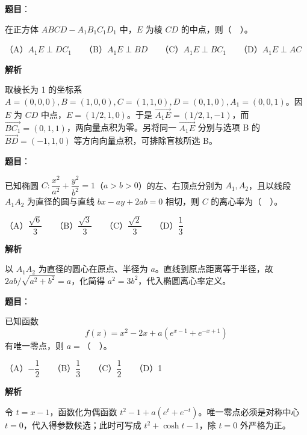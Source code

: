 \begin{answer}

\textbf{题目}：

在正方体 \(ABCD-A_1B_1C_1D_1\) 中，\(E\) 为棱 \(CD\) 的中点，则（　）。

（A）\(A_1E\perp DC_1\)　　（B）\(A_1E\perp BD\)　　（C）\(A_1E\perp BC_1\)　　（D）\(A_1E\perp AC\)

\textbf{解析}

取棱长为 1 的坐标系 \(A=(0,0,0),B=(1,0,0),C=(1,1,0),D=(0,1,0),A_1=(0,0,1)\)。因 \(E\) 为 \(CD\) 中点，\(E=(1/2,1,0)\)。于是 \(\overrightarrow{A_1E}=(1/2,1,-1)\)，而 \(\overrightarrow{BC_1}=(0,1,1)\)，两向量点积为零。另将同一 \(\overrightarrow{A_1E}\) 分别与选项 B 的 \(\overrightarrow{BD}=(-1,1,0)\) 等方向向量点积，可排除盲核所选 B。


\end{answer}
\begin{answer}

\textbf{题目}：

已知椭圆 \(C:\dfrac{x^2}{a^2}+\dfrac{y^2}{b^2}=1\)（\(a>b>0\)）的左、右顶点分别为 \(A_1,A_2\)，且以线段 \(A_1A_2\) 为直径的圆与直线 \(bx-ay+2ab=0\) 相切，则 \(C\) 的离心率为（　）。

（A）\(\dfrac{\sqrt{6}}{3}\)　　（B）\(\dfrac{\sqrt{3}}{3}\)　　（C）\(\dfrac{\sqrt{2}}{3}\)　　（D）\(\dfrac{1}{3}\)

\textbf{解析}

以 \(A_1A_2\) 为直径的圆心在原点、半径为 \(a\)。直线到原点距离等于半径，故 \(2ab/\sqrt{a^2+b^2}=a\)，化简得 \(a^2=3b^2\)，代入椭圆离心率定义。


\end{answer}
\begin{answer}

\textbf{题目}：

已知函数
\nopagebreak[4]
\[
f(x)=x^2-2x+a\left(e^{x-1}+e^{-x+1}\right)
\]
有唯一零点，则 \(a=\)（　）。

（A）\(-\dfrac{1}{2}\)　　（B）\(\dfrac{1}{3}\)　　（C）\(\dfrac{1}{2}\)　　（D）1

\textbf{解析}

令 \(t=x-1\)，函数化为偶函数 \(t^2-1+a(e^t+e^{-t})\)。唯一零点必须是对称中心 \(t=0\)，代入得参数候选；此时可写成 \(t^2+\cosh t-1\)，除 \(t=0\) 外严格为正。


\end{answer}
